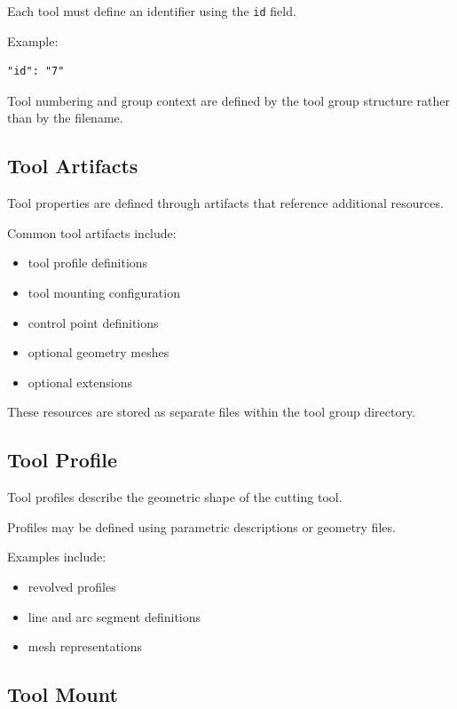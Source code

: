 Each tool must define an identifier using the \texttt{id} field.

Example:

\begin{verbatim}
"id": "7"
\end{verbatim}

Tool numbering and group context are defined by the tool group structure rather than by the filename.

\subsection{Tool Artifacts}

Tool properties are defined through artifacts that reference additional resources.

Common tool artifacts include:

\begin{itemize}
\item tool profile definitions
\item tool mounting configuration
\item control point definitions
\item optional geometry meshes
\item optional extensions
\end{itemize}

These resources are stored as separate files within the tool group directory.

\subsection{Tool Profile}

Tool profiles describe the geometric shape of the cutting tool.

Profiles may be defined using parametric descriptions or geometry files.

Examples include:

\begin{itemize}
\item revolved profiles
\item line and arc segment definitions
\item mesh representations
\end{itemize}

\subsection{Tool Mount}

